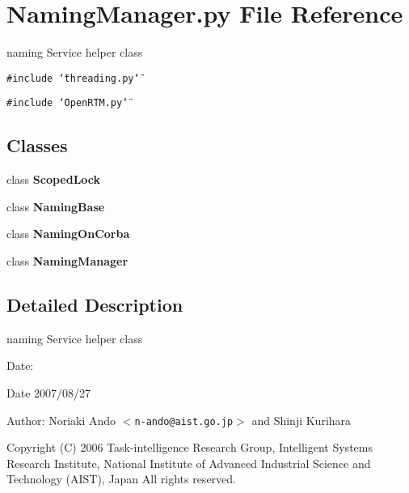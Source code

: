 \section{Naming\-Manager.py File Reference}
\label{NamingManager_8py}
naming Service helper class 

{\tt \#include \char`\"{}threading.py\char`\"{}}\par
{\tt \#include \char`\"{}Open\-RTM.py\char`\"{}}\par
\subsection*{Classes}
\begin{CompactItemize}
\item 
class {\bf Scoped\-Lock}
\item 
class {\bf Naming\-Base}
\item 
class {\bf Naming\-On\-Corba}
\item 
class {\bf Naming\-Manager}
\end{CompactItemize}


\subsection{Detailed Description}
naming Service helper class 

\begin{Desc}
\item[Date:]\begin{Desc}
\item[Date]2007/08/27\end{Desc}
\end{Desc}
\begin{Desc}
\item[Author:]Noriaki Ando $<${\tt n-ando@aist.go.jp}$>$ and Shinji Kurihara\end{Desc}
Copyright (C) 2006 Task-intelligence Research Group, Intelligent Systems Research Institute, National Institute of Advanced Industrial Science and Technology (AIST), Japan All rights reserved.